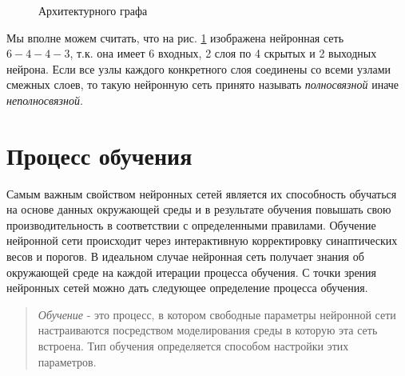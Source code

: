 \documentclass[a4paper,12pt]{report}
\begin{document}
\begin{figure}[!htb]
    \caption{Архитектурного графа}
    \label{fig:arch graph}
\end{figure}

Мы вполне можем считать, что на рис. \ref{fig:arch graph} изображена
нейронная сеть $6-4-4-3$, т.к. она имеет 6 входных, 2 слоя по 4
скрытых и 2 выходных нейрона. Если все узлы каждого конкретного слоя
соединены со всеми узлами смежных слоев, то такую нейронную сеть
принято называть \textit{полносвязной} иначе \textit{неполносвязной}.

\section{Процесс обучения}
Самым важным свойством нейронных сетей является их способность
обучаться на основе данных окружающей среды и в результате обучения
повышать свою производительность в соответствии с определенными
правилами. Обучение нейронной сети происходит через интерактивную
корректировку синаптических весов и порогов. В идеальном случае
нейронная сеть получает знания об окружающей среде на каждой итерации
процесса обучения. С точки зрения нейронных сетей можно дать следующее
определение процесса обучения.
\begin{quote}
    \textit{Обучение} - это процесс, в котором свободные параметры
    нейронной сети настраиваются посредством моделирования среды в
    которую эта сеть встроена. Тип обучения определяется способом
    настройки этих параметров.
\end{quote}
\end{document}
